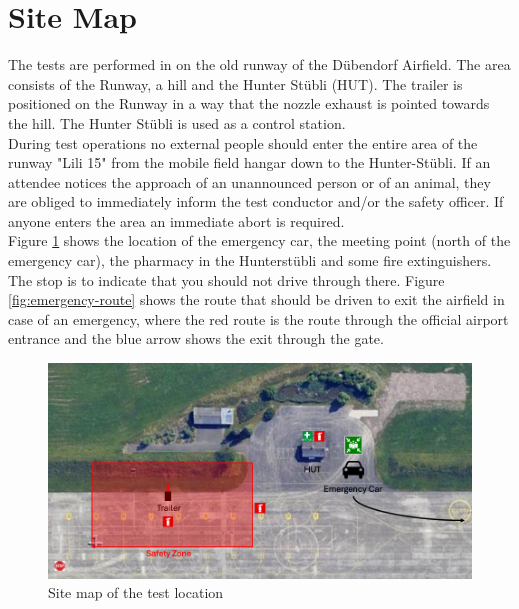 \documentclass{article}
\begin{document}
\section{Site Map}
The tests are performed in on the old runway of the Dübendorf Airfield. The area consists of the Runway, a hill and the Hunter Stübli (HUT). The trailer is positioned on the Runway in a way that the nozzle exhaust is pointed towards the hill. The Hunter Stübli is used as a control station. \\
\noindent
During test operations no external people should enter the entire area of the runway "Lili 15" from the mobile field hangar down to the Hunter-Stübli. If an attendee notices the approach of an unannounced person or of an animal, they are obliged to immediately inform the test conductor and/or the safety officer. If anyone enters the area an immediate abort is required. \\
\noindent
Figure \ref{fig:location-plan} shows the location of the emergency car, the meeting point (north of the emergency car), the pharmacy in the Hunterstübli and some fire extinguishers. The stop is to indicate that you should not drive through there. 
Figure \ref{fig:emergency-route} shows the route that should be driven to exit the airfield in case of an emergency, where the red route is the route through the official airport entrance and the blue arrow shows the exit through the gate.
\begin{figure}[h]
    \centering
    \includegraphics[width=\textwidth]{assets/location_map.png}
    \caption{Site map of the test location}
    \label{fig:location-plan}
\end{figure}

\newpage
\end{document}
